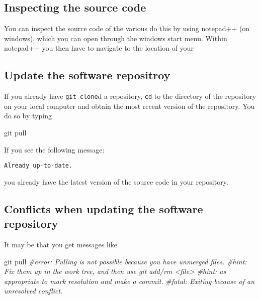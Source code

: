 \documentclass[
]{book}
\newenvironment{Shaded}{\begin{snugshade}}{\end{snugshade}}
\newcommand{\CommentTok}[1]{\textcolor[rgb]{0.56,0.35,0.01}{\textit{#1}}}
\newcommand{\FunctionTok}[1]{\textcolor[rgb]{0.00,0.00,0.00}{#1}}
\newcommand{\NormalTok}[1]{#1}
\begin{document}
\hypertarget{inspecting-the-source-code}{%
\subsection{Inspecting the source code}\label{inspecting-the-source-code}}

You can inspect the source code of the various do this by using
notepad++ (on windows), which you can open through the windows start menu. Within notepad++
you then have to navigate to the location of your

\hypertarget{update-the-software-repositroy}{%
\subsection{Update the software repositroy}\label{update-the-software-repositroy}}

If you already have \texttt{git\ clone}d a repository, \texttt{cd} to the directory of the repository on your local computer and obtain the most recent version of the repository. You do so by typing

\begin{Shaded}
\begin{Highlighting}[]
\FunctionTok{git}\NormalTok{ pull}
\end{Highlighting}
\end{Shaded}

If you see the following message:

\begin{verbatim}
Already up-to-date.
\end{verbatim}

you already have the latest version of the source code in your repository.

\hypertarget{conflicts-when-updating-the-software-repository}{%
\subsection{Conflicts when updating the software repository}\label{conflicts-when-updating-the-software-repository}}

It may be that you get messages like

\begin{Shaded}
\begin{Highlighting}[]
\FunctionTok{git}\NormalTok{ pull}
\CommentTok{\#error: Pulling is not possible because you have unmerged files.}
\CommentTok{\#hint: Fix them up in the work tree, and then use \textquotesingle{}git add/rm \textless{}file\textgreater{}\textquotesingle{}}
\CommentTok{\#hint: as appropriate to mark resolution and make a commit.}
\CommentTok{\#fatal: Exiting because of an unresolved conflict.}
\end{Highlighting}
\end{Shaded}
\end{document}
